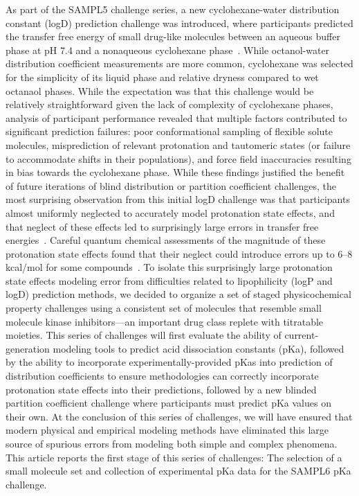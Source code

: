 \documentclass[9pt,lineno]{elife}
\begin{document}
As part of the SAMPL5 challenge series, a new cyclohexane-water distribution constant (logD) prediction challenge was introduced, where participants predicted the transfer free energy of small drug-like molecules between an aqueous buffer phase at pH 7.4 and a nonaqueous cyclohexane phase~\citep{bannan_blind_2016,rustenburg_measuring_2016}. 
While octanol-water distribution coefficient measurements are more common, cyclohexane was selected for the simplicity of its liquid phase and relative dryness compared to wet octanaol phases.
While the expectation was that this challenge would be relatively straightforward given the lack of complexity of cyclohexane phases, analysis of participant performance revealed that multiple factors contributed to significant prediction failures: poor conformational sampling of flexible solute molecules, misprediction of relevant protonation and tautomeric states (or failure to accommodate shifts in their populations), and force field inaccuracies resulting in bias towards the cyclohexane phase.
While these findings justified the benefit of future iterations of blind distribution or partition coefficient challenges, the most surprising observation from this initial logD challenge was that participants almost uniformly neglected to accurately model protonation state effects, and that neglect of these effects led to surprisingly large errors in transfer free energies~\citep{bannan_blind_2016, pickard_blind_2016,rustenburg_measuring_2016}. 
Careful quantum chemical assessments of the magnitude of these protonation state effects found that their neglect could introduce errors up to 6--8 kcal/mol for some compounds~\citep{pickard_blind_2016}.  
To isolate this surprisingly large protonation state effects modeling error from difficulties related to lipophilicity (logP and logD) prediction methods, we decided to organize a set of staged physicochemical property challenges using a consistent set of molecules that resemble small molecule kinase inhibitors---an important drug class replete with titratable moieties.
This series of challenges will first evaluate the ability of current-generation modeling tools to predict acid dissociation constants (pKa), followed by the ability to incorporate experimentally-provided pKas into prediction of distribution coefficients to ensure methodologies can correctly incorporate protonation state effects into their predictions, followed by a new blinded partition coefficient challenge where participants must predict pKa values on their own.
At the conclusion of this series of challenges, we will have ensured that modern physical and empirical modeling methods have eliminated this large source of spurious errors from modeling both simple and complex phenomena.
This article reports the first stage of this series of challenges: The selection of a small molecule set and collection of experimental pKa data for the SAMPL6 pKa challenge.
\end{document}
